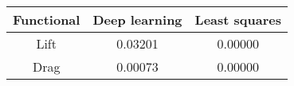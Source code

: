 \begin{tabular}{|c|c|c|}
\hline
Functional&Deep learning&Least squares\\ 
\hline

Lift & 0.03201 & 0.00000\\ 
\hline
Drag & 0.00073 & 0.00000\\ 
\hline
\end{tabular}

